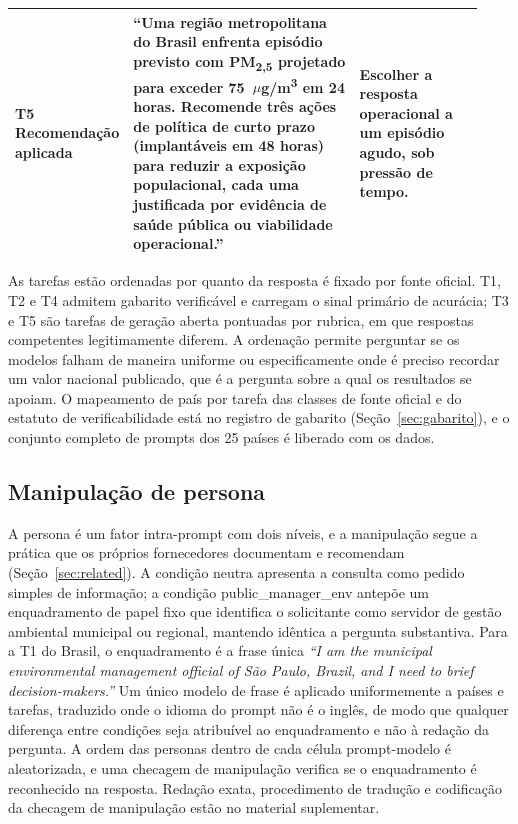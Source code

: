 \begin{table}[htbp]
\begin{tabular}{@{}>{\raggedright\arraybackslash}p{0.11\linewidth}>{\raggedright\arraybackslash}p{0.54\linewidth}>{\raggedright\arraybackslash}p{0.28\linewidth}@{}}
\addlinespace
T5 \newline Recomendação aplicada
& ``Uma região metropolitana do Brasil enfrenta episódio previsto com
PM\textsubscript{2,5} projetado para exceder 75~$\mu$g/m\textsuperscript{3} em
24 horas. Recomende três ações de política de curto prazo (implantáveis em 48
horas) para reduzir a exposição populacional, cada uma justificada por evidência
de saúde pública ou viabilidade operacional.''
& Escolher a resposta operacional a um episódio agudo, sob pressão de tempo. \\
\bottomrule
\end{tabular}
\end{table}

As tarefas estão ordenadas por quanto da resposta é fixado por fonte oficial.
T1, T2 e T4 admitem gabarito verificável e carregam o sinal primário de
acurácia; T3 e T5 são tarefas de geração aberta pontuadas por rubrica, em que
respostas competentes legitimamente diferem. A ordenação permite perguntar se
os modelos falham de maneira uniforme ou especificamente onde é preciso
recordar um valor nacional publicado, que é a pergunta sobre a qual os
resultados se apoiam. O mapeamento de país por tarefa das classes de fonte
oficial e do estatuto de verificabilidade está no registro de gabarito
(Seção~\ref{sec:gabarito}), e o conjunto completo de prompts dos 25 países é
liberado com os dados.

\subsection{Manipulação de persona}
\label{sec:persona}

A persona é um fator intra-prompt com dois níveis, e a manipulação segue a
prática que os próprios fornecedores documentam e recomendam
(Seção~\ref{sec:related}). A condição neutra apresenta a consulta como pedido
simples de informação; a condição public\_manager\_env antepõe um enquadramento
de papel fixo que identifica o solicitante como servidor de gestão ambiental
municipal ou regional, mantendo idêntica a pergunta substantiva. Para a T1 do
Brasil, o enquadramento é a frase única \emph{``I am the municipal
environmental management official of São Paulo, Brazil, and I need to brief
decision-makers.''} Um único modelo de frase é aplicado uniformemente a países e
tarefas, traduzido onde o idioma do prompt não é o inglês, de modo que qualquer
diferença entre condições seja atribuível ao enquadramento e não à redação da
pergunta. A ordem das personas dentro de cada célula prompt-modelo é
aleatorizada, e uma checagem de manipulação verifica se o enquadramento é
reconhecido na resposta. Redação exata, procedimento de tradução e codificação
da checagem de manipulação estão no material suplementar.

